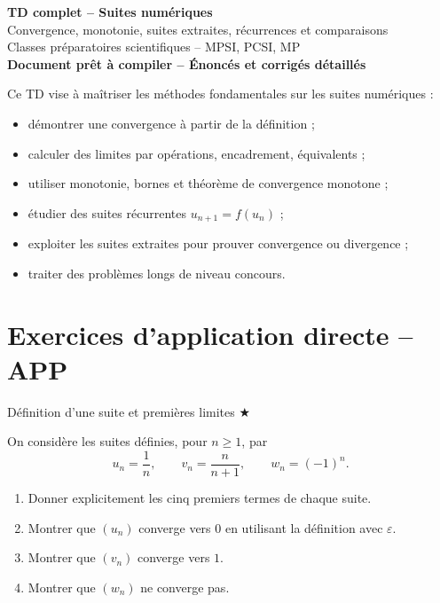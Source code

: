 \documentclass[11pt,a4paper]{article}
\newcounter{exo}
\newcommand{\etoiles}[1]{\hfill{\small\textcolor{orangeprepa}{#1}}}
\newcommand{\exercice}[2]{
  \refstepcounter{exo}
  \begin{exercicebox}{\theexo}{#1}
  #2
  \end{exercicebox}
}
\newcommand{\eps}{\varepsilon}
\begin{document}
\begin{center}
{\Huge \bfseries TD complet -- Suites numériques}\\[0.2cm]
{\Large Convergence, monotonie, suites extraites, récurrences et comparaisons}\\[0.2cm]
{\large Classes préparatoires scientifiques -- MPSI, PCSI, MP}\\[0.3cm]
\textbf{Document prêt à compiler -- Énoncés et corrigés détaillés}
\end{center}

\vspace{0.4cm}

\begin{tcolorbox}[colframe=rougeprepa,colback=red!2!white,title={Objectifs du TD}]
Ce TD vise à maîtriser les méthodes fondamentales sur les suites numériques :
\begin{itemize}
  \item démontrer une convergence à partir de la définition ;
  \item calculer des limites par opérations, encadrement, équivalents ;
  \item utiliser monotonie, bornes et théorème de convergence monotone ;
  \item étudier des suites récurrentes \(u_{n+1}=f(u_n)\) ;
  \item exploiter les suites extraites pour prouver convergence ou divergence ;
  \item traiter des problèmes longs de niveau concours.
\end{itemize}
\end{tcolorbox}

\tableofcontents
\newpage

\section{Exercices d'application directe -- APP}

\exercice{Définition d'une suite et premières limites \etoiles{★}}{
On considère les suites définies, pour \(n\geq 1\), par
\[
u_n=\frac{1}{n},\qquad v_n=\frac{n}{n+1},\qquad w_n=(-1)^n.
\]
\begin{enumerate}
  \item Donner explicitement les cinq premiers termes de chaque suite.
  \item Montrer que \((u_n)\) converge vers \(0\) en utilisant la définition avec \(\eps\).
  \item Montrer que \((v_n)\) converge vers \(1\).
  \item Montrer que \((w_n)\) ne converge pas.
\end{enumerate}
}
\end{document}
